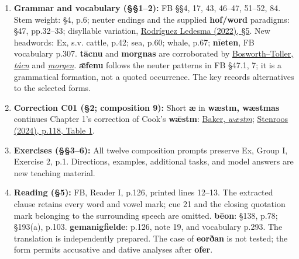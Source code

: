 \begin{enumerate}
\item[1.] \textbf{Grammar and vocabulary (§§1–2):} FB §§4, 17, 43, 46–47, 51–52, 84. Stem weight: §4, p.6; neuter endings and the supplied \textbf{hof/word} paradigms: §47, pp.32–33; disyllable variation, \href{https://doi.org/10.1017/S1360674321000435}{Rodríguez Ledesma (2022), §5}. New headwords: Ex, s.v. cattle, p.42; sea, p.60; whale, p.67; \textbf{nīeten}, FB vocabulary p.307. \textbf{tācnu} and \textbf{morgnas} are corroborated by \href{https://bosworthtoller.com/58972}{Bosworth–Toller, \emph{tácn}} and \href{https://bosworthtoller.com/23129}{\emph{morgen}}. \textbf{ǣfenu} follows the neuter patterns in FB §47.1, 7; it is a grammatical formation, not a quoted occurrence. The key records alternatives to the selected forms.
\item[2.] \textbf{Correction C01 (§2; composition 9):} Short \textbf{æ} in \textbf{wæstm, wæstmas} continues Chapter 1's correction of Cook's \textbf{wǣstm}: \href{https://glossary.oldenglishaerobics.net/oeaginfo.php?objid=xwaestm\&objtype=gentry}{Baker, \emph{wæstm}}; \href{https://doi.org/10.17811/selim.29.2024.109-25}{Stenroos (2024), p.118, Table 1}.
\item[3.] \textbf{Exercises (§§3–6):} All twelve composition prompts preserve Ex, Group I, Exercise 2, p.1. Directions, examples, additional tasks, and model answers are new teaching material.
\item[4.] \textbf{Reading (§5):} FB, Reader I, p.126, printed lines 12–13. The extracted clause retains every word and vowel mark; cue 21 and the closing quotation mark belonging to the surrounding speech are omitted. \textbf{bēon}: §138, p.78; §193(a), p.103. \textbf{gemanigfielde}: p.126, note 19, and vocabulary p.293. The translation is independently prepared. The case of \textbf{eorðan} is not tested; the form permits accusative and dative analyses after \textbf{ofer}.
\end{enumerate}

\endgroup


